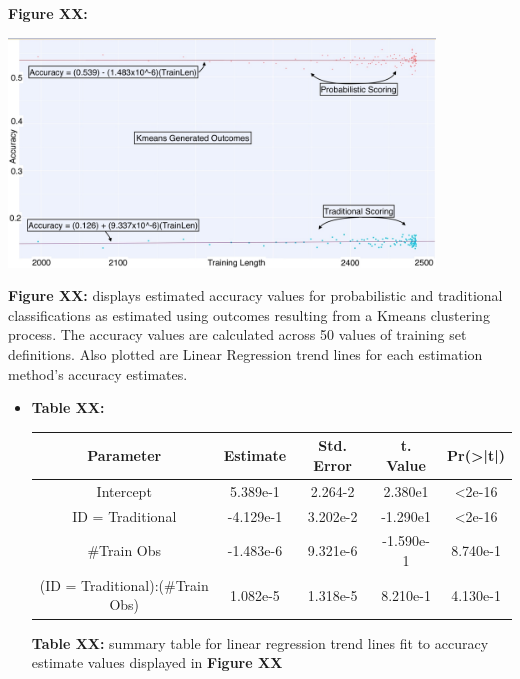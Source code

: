 \documentclass[12pt,]{article}
\providecommand{\tightlist}{%
  \setlength{\itemsep}{0pt}\setlength{\parskip}{0pt}}
\begin{document}
\textbf{Figure XX:}

\begin{center}
\includegraphics[width=0.85\textwidth]{KMeansResultsGraph.jpeg}
\end{center}

\textbf{Figure XX:} displays estimated accuracy values for probabilistic
and traditional classifications as estimated using outcomes resulting
from a Kmeans clustering process. The accuracy values are calculated
across 50 values of training set definitions. Also plotted are Linear
Regression trend lines for each estimation method's accuracy estimates.

\begin{itemize}
\tightlist
\item
  \textbf{Table XX:}

  \begin{center}
  \begin{tabular}{|c|c|c|c|c|}
  \hline
  Parameter                      & Estimate  & Std. Error & t. Value  & Pr(>|t|) \\
  \hline
  \hline
  Intercept                      &  5.389e-1 &  2.264-2  &  2.380e1  & <2e-16   \\
  \hline
  ID = Traditional               & -4.129e-1 &  3.202e-2  & -1.290e1  & <2e-16 \\
  \hline
  \#Train Obs                    &  -1.483e-6 &  9.321e-6  &  -1.590e-1  & 8.740e-1 \\
  \hline
  (ID = Traditional):(\#Train Obs) &  1.082e-5 &  1.318e-5  &  8.210e-1 & 4.130e-1 \\
  \hline
  \end{tabular}
  \end{center}

  \textbf{Table XX:} summary table for linear regression trend lines fit
  to accuracy estimate values displayed in \textbf{Figure XX}
\end{itemize}
\end{document}
